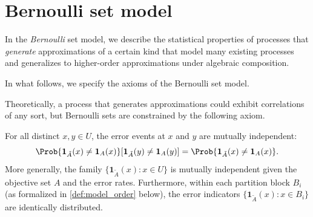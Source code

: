 
\section{Bernoulli set model}
\label{sec:bernoulli_model}
In the \emph{Bernoulli} set model, we describe the statistical properties of processes that \emph{generate} approximations of a certain kind that model many existing processes and generalizes to higher-order approximations under algebraic composition.

In what follows, we specify the axioms of the Bernoulli set model.

Theoretically, a process that generates approximations could exhibit correlations of any sort, but Bernoulli sets are constrained by the following axiom.
\begin{axiom}
\label{asm:element_indep}
For all distinct $x, y \in U$, the error events at $x$ and $y$ are mutually independent:
\begin{equation}
\Prob{\mathbf{1}_{\tilde{A}}(x) \neq \mathbf{1}_{A}(x)}[\mathbf{1}_{\tilde{A}}(y) \neq \mathbf{1}_{A}(y)] =
	\Prob{\mathbf{1}_{\tilde{A}}(x) \neq \mathbf{1}_{A}(x)}.
\end{equation}
More generally, the family $\{\mathbf{1}_{\tilde{A}}(x) : x \in U\}$ is mutually independent given the objective set $A$ and the error rates.
Furthermore, within each partition block $B_i$ (as formalized in \cref{def:model_order} below), the error indicators $\{\mathbf{1}_{\tilde{A}}(x) : x \in B_i\}$ are identically distributed.
\end{axiom}

